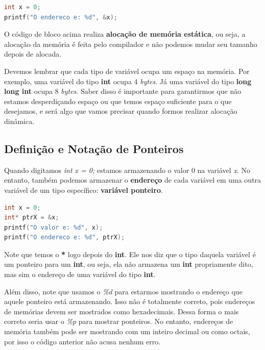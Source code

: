 \begin{lstlisting}[language=C]
int x = 0;
printf("O endereco e: %d", &x);
\end{lstlisting}

O código de bloco acima realiza \textbf{alocação de memória estática}, ou seja, a alocação da memória
é feita pelo compilador e não podemos mudar seu tamanho depois de alocada.

Devemos lembrar que cada tipo de variável ocupa um espaço na memória. Por exemplo, uma variável
do tipo \textbf{int} ocupa 4 \textit{bytes}. Já uma variável do tipo \textbf{long long int} ocupa 8 \textit{bytes}.
Saber disso é importante para garantirmos que não estamos desperdiçando espaço ou que temos espaço suficiente
para o que desejamos, e será algo que vamos precisar quando formos realizar alocação dinâmica.

\subsection{Definição e Notação de Ponteiros}
Quando digitamos \textit{int x = 0;} estamos armazenando o valor 0 na variável \textit{x}. No entanto,
também podemos armazenar o \textbf{endereço} de cada variável em uma outra variável de um tipo específico:
\textbf{variável ponteiro}.

\begin{lstlisting}[language=C]
int x = 0;
int* ptrX = &x;
printf("O valor e: %d", x);
printf("O endereco e: %d", ptrX);
\end{lstlisting}

Note que temos o \textbf{*} logo depois do \textbf{int}. Ele nos diz que o tipo daquela variável é um
ponteiro para um \textbf{int}, ou seja, ela não armazena um \textbf{int} propriamente dito, mas sim o
endereço de uma variável do tipo \textbf{int}.

Além disso, note que usamos o \textit{\%d} para estarmos mostrando o endereço que aquele
ponteiro está armazenando. Isso não é totalmente correto, pois endereços de memórias devem ser mostrados
como hexadecimais. Dessa forma o mais correto seria usar o \textit{\%p} para mostrar ponteiros. No entanto,
endereços de memória também pode ser mostrando com um inteiro decimal ou como octais,
por isso o código anterior não acusa nenhum erro.

